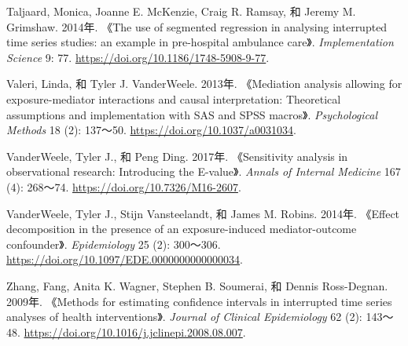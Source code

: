 \documentclass[
  chinese-hans,
  letterpaper,
  DIV=11,
  numbers=noendperiod]{scrreprt}
\newlength{\cslhangindent}
\newenvironment{CSLReferences}[2] %
 {\begin{list}{}{%
  \setlength{\itemindent}{0pt}
  \setlength{\leftmargin}{0pt}
  \setlength{\parsep}{0pt}
  \ifodd #1
   \setlength{\leftmargin}{\cslhangindent}
   \setlength{\itemindent}{-1\cslhangindent}
  \fi
  \setlength{\itemsep}{#2\baselineskip}}}
 {\end{list}}
\begin{document}
\begin{CSLReferences}{1}{1}
Taljaard, Monica, Joanne E. McKenzie, Craig R. Ramsay, 和 Jeremy M.
Grimshaw. 2014年. {《The use of segmented regression in analysing
interrupted time series studies: an example in pre-hospital ambulance
care》}. \emph{Implementation Science} 9: 77.
\url{https://doi.org/10.1186/1748-5908-9-77}.

Valeri, Linda, 和 Tyler J. VanderWeele. 2013年. {《Mediation analysis
allowing for exposure-mediator interactions and causal interpretation:
Theoretical assumptions and implementation with {SAS} and {SPSS}
macros》}. \emph{Psychological Methods} 18 (2): 137～50.
\url{https://doi.org/10.1037/a0031034}.

VanderWeele, Tyler J., 和 Peng Ding. 2017年. {《Sensitivity analysis in
observational research: Introducing the {E}-value》}. \emph{Annals of
Internal Medicine} 167 (4): 268～74.
\url{https://doi.org/10.7326/M16-2607}.

VanderWeele, Tyler J., Stijn Vansteelandt, 和 James M. Robins. 2014年.
{《Effect decomposition in the presence of an exposure-induced
mediator-outcome confounder》}. \emph{Epidemiology} 25 (2): 300～306.
\url{https://doi.org/10.1097/EDE.0000000000000034}.

Zhang, Fang, Anita K. Wagner, Stephen B. Soumerai, 和 Dennis
Ross-Degnan. 2009年. {《Methods for estimating confidence intervals in
interrupted time series analyses of health interventions》}.
\emph{Journal of Clinical Epidemiology} 62 (2): 143～48.
\url{https://doi.org/10.1016/j.jclinepi.2008.08.007}.

\end{CSLReferences}
\end{document}
